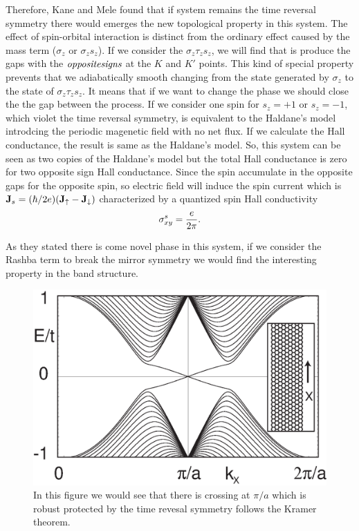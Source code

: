 \documentclass[12pt,a4paper]{article}
\begin{document}
Therefore, Kane and Mele found that if system remains the time reversal 
symmetry there would emerges the new topological property in this system.
The effect of spin-orbital interaction is distinct from the ordinary effect
caused by the mass term ($\sigma_z$ or $\sigma_z s_z$). If we consider the
$\sigma_z \tau_z s_z$, we will find that is produce the gaps with the $\it
opposite signs$ at the $K$ and $K'$ points. This kind of special property
prevents that we adiabatically smooth changing from the state generated by
$\sigma_z$ to the state of $\sigma_z\tau_z s_z$. It means that if we want
to change the phase we should close the the gap between the process. If we
consider one spin for $s_z=+1$ or $s_z=-1$, which violet the time reversal
symmetry, is equivalent to the Haldane's model introdcing the periodic
magenetic field with no net flux. If we calculate the Hall conductance, the
result is same as the Haldane's model. So, this system can be seen as two
copies of the Haldane's model but the total Hall conductance is zero for
two opposite sign Hall conductance. Since the spin accumulate in the
opposite gaps for the opposite spin, so electric field will induce the spin
current which is ${\bf J}_s = (\hbar/2e)({\bf J}_\uparrow-{\bf
J}_\downarrow)$ characterized by a quantized spin Hall
conductivity
\begin{equation*}
\sigma^s_{xy}={e\over{2\pi}}.
\end{equation*}

\noindent
As they stated there is come novel phase in this system, if we consider the
Rashba term to break the mirror symmetry we would find the interesting
property in the band structure.
\begin{figure}[htpb]
  \centering
  \includegraphics[width=0.6\linewidth]{fig1.eps}
  \caption{In this figure we would see that there is crossing at
  $\pi/a$ which is robust protected by the time revesal symmetry
follows the Kramer theorem.}%
  \label{fig:fig1}
\end{figure}\\
\end{document}
